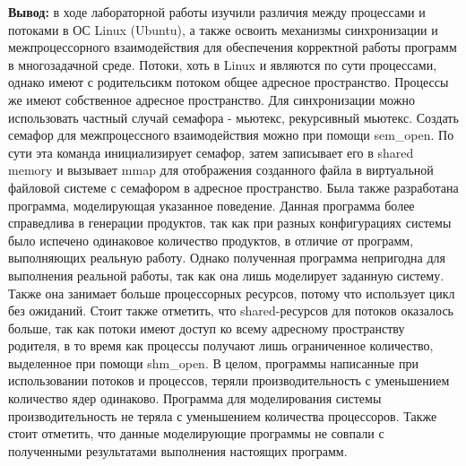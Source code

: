 \documentclass[a4paper,14pt]{extarticle}
\begin{document}
\textbf{Вывод: } в ходе лабораторной работы изучили различия между процессами и потоками в ОС Linux (Ubuntu), а также
освоить механизмы синхронизации и межпроцессорного взаимодействия для обеспечения корректной работы программ в многозадачной среде. 
Потоки, хоть в Linux и являются по сути процессами, однако имеют с родительсикм потоком общее адресное пространство. 
Процессы же имеют собственное адресное пространство. Для синхронизации можно использовать частный случай семафора - 
мьютекс, рекурсивный мьютекс. Создать семафор для межпроцессного взаимодействия можно при помощи sem\_open. По сути 
эта команда инициализирует семафор, затем записывает его в shared memory и вызывает mmap для отображения созданного 
файла в виртуальной файловой системе с семафором в адресное пространство. Была также разработана программа, моделирующая 
указанное поведение. Данная программа более справедлива в генерации продуктов, так как при разных конфигурациях системы
было испечено одинаковое количество продуктов, в отличие от программ, выполняющих реальную работу. Однако полученная 
программа непригодна для выполнения реальной работы, так как она лишь моделирует заданную систему. Также она занимает больше процессорных ресурсов, 
потому что использует цикл без ожиданий. Стоит также отметить, 
что shared-ресурсов для потоков оказалось больше, так как потоки имеют доступ ко всему адресному пространству родителя, 
в то время как процессы получают лишь ограниченное количество, выделенное при помощи shm\_open. В целом, программы написанные
при использовании потоков и процессов, теряли производительность с уменьшением количество ядер одинаково. Программа для моделирования
системы производительность не теряла с уменьшением количества процессоров. Также стоит отметить, что данные моделирующие программы 
не совпали с полученными результатами выполнения настоящих программ. 
\end{document}
